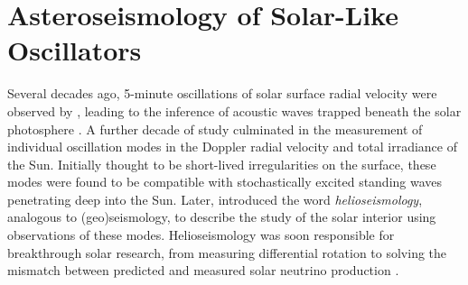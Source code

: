 %
%
%
%
%
\chapter[Asteroseismology]{Asteroseismology of Solar-Like Oscillators}

Several decades ago, 5-minute oscillations of solar surface radial velocity were observed by \citet{Leighton.Noyes.ea1962}, leading to the inference of acoustic waves trapped beneath the solar photosphere \citep{Ulrich1970}. A further decade of study culminated in the measurement of individual oscillation modes in the Doppler radial velocity \citep{Claverie.Isaak.ea1979} and total irradiance \citep{Woodard.Hudson1983a} of the Sun. Initially thought to be short-lived irregularities on the surface, these modes were found to be compatible with stochastically excited standing waves penetrating deep into the Sun. Later, \citet{Deubner.Gough1984} introduced the word \emph{helioseismology}, analogous to (geo)seismology, to describe the study of the solar interior using observations of these modes. Helioseismology was soon responsible for breakthrough solar research, from measuring differential rotation \citep{Deubner.Ulrich.ea1979} to solving the mismatch between predicted and measured solar neutrino production \citep{Bahcall.Ulrich1988}.


